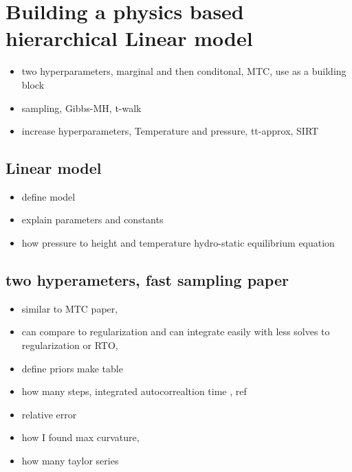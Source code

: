 
\chapter{Building a physics based hierarchical Linear model}
\begin{itemize}
	\item two hyperparameters, marginal and then conditonal, MTC, use as a building block \cite{fox2016fast, rue2005gaussian}
	\item  sampling, Gibbs-MH, t-walk \cite{christen2010general}
	\item increase hyperparameters, Temperature and pressure, tt-approx, SIRT \cite{cui2022deep, atmosphere1976us}
\end{itemize}

\section{Linear model}
\begin{itemize}
	\item define model \cite{readings2000envisat}
	\item explain parameters and constants \cite{gordon2022hitran2020}
	\item how pressure to height and temperature hydro-static equilibrium equation \cite{atmosphere1976us}
\end{itemize}

\section{two hyperameters, fast sampling paper}
\begin{itemize}
	\item similar to MTC paper,  \cite{fox2016fast}
	\item can compare to regularization and can integrate easily with less solves to regularization or RTO, \cite{hansen1993use}
	\item define priors make table
	\item how many steps, integrated autocorrealtion time , ref
	\item relative error
	\item how I found max curvature, \cite{satopaa2011kneedle}
	\item how many taylor series
\end{itemize}

